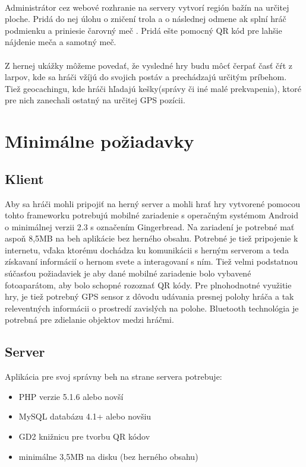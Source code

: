 \paragraph{}
Administrátor cez webové rozhranie na servery vytvorí región bažín na určitej ploche. Pridá do nej úlohu o zničení trola a o následnej odmene ak splní hráč podmienku a priniesie čarovný meč . Pridá ešte pomocný QR kód pre lahšie nájdenie meča a samotný meč.\

\paragraph{}
Z hernej ukážky môžeme povedať, že vysledné hry budu môcť čerpať časť čŕt z larpov, kde sa hráči vžíjú do svojich postáv a prechádzajú určitým príbehom. Tiež geocachingu, kde hráči hľadajú kešky(správy či iné malé prekvapenia), ktoré pre nich zanechali ostatný na určitej GPS pozícii.

\section{Minimálne požiadavky}
\subsection{Klient}
Aby sa hráči mohli pripojiť na herný server a mohli hrať hry vytvorené pomocou tohto frameworku potrebujú mobilné zariadenie s operačným systémom Android o minimálnej verzii 2.3 s označením Gingerbread. Na zariadení je potrebné mať aspoň 8,5MB na beh aplikácie bez herného obsahu. Potrebné je tiež pripojenie k internetu, vďaka ktorému dochádza ku komunikácii s herným serverom a teda získavaní informácií o hernom svete a interagovaní s ním. Tiež velmi podstatnou súčasťou požiadaviek je aby dané mobilné zariadenie bolo vybavené fotoaparátom, aby bolo schopné rozoznať QR kódy. Pre plnohodnotné využitie hry, je tiež potrebný GPS sensor z dôvodu udávania presnej polohy hráča a tak releventných informácii o prostredí zavislých na polohe. Bluetooth technológia je potrebná pre zdielanie objektov medzi hráčmi. 


\subsection{Server}
Aplikácia pre svoj správny beh na strane servera potrebuje:
\begin{itemize}
\item PHP verzie 5.1.6 alebo novší \cite{codeigniter-requirements}
\item MySQL databázu 4.1+ alebo novšiu \cite{codeigniter-requirements}
\item GD2 knižnicu pre tvorbu QR kódov \cite{qrgenerator-info}
\item minimálne 3,5MB na disku (bez herného obsahu)
\end{itemize}

